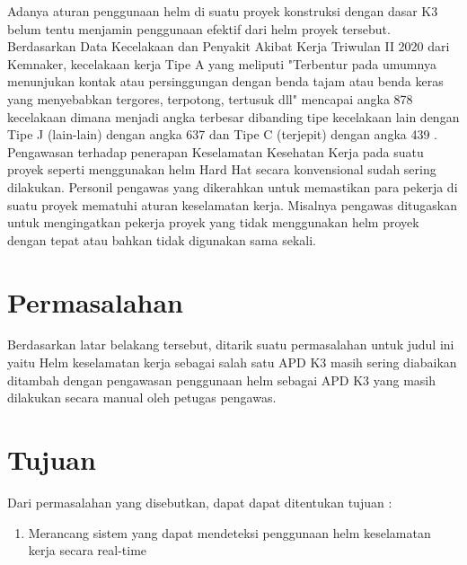 Adanya aturan penggunaan helm di suatu proyek konstruksi dengan dasar K3 belum tentu menjamin penggunaan efektif dari helm proyek tersebut. 
Berdasarkan Data Kecelakaan dan Penyakit Akibat Kerja Triwulan II 2020 dari Kemnaker, kecelakaan kerja Tipe A yang meliputi "Terbentur pada umumnya menunjukan kontak atau persinggungan dengan benda tajam atau benda keras yang menyebabkan tergores, terpotong, tertusuk dll" mencapai angka 878 kecelakaan dimana menjadi angka terbesar dibanding tipe kecelakaan lain dengan Tipe J (lain-lain) dengan angka 637 dan Tipe C (terjepit) dengan angka 439 \cite{satudata_kecelakaan_kerja}.
Pengawasan terhadap penerapan Keselamatan Kesehatan Kerja pada suatu proyek seperti menggunakan helm Hard Hat secara konvensional sudah sering dilakukan. Personil pengawas yang dikerahkan untuk memastikan para pekerja di suatu proyek mematuhi aturan keselamatan kerja. Misalnya pengawas ditugaskan untuk mengingatkan pekerja proyek yang tidak menggunakan helm proyek dengan tepat atau bahkan tidak digunakan sama sekali.\cite{li2020deep}

\section{Permasalahan}
\label{sec:permasalahan}

Berdasarkan latar belakang tersebut, ditarik suatu permasalahan untuk judul ini yaitu Helm keselamatan kerja sebagai salah satu APD K3 masih sering diabaikan ditambah dengan pengawasan penggunaan helm sebagai APD K3 yang masih dilakukan secara manual oleh petugas pengawas.

\section{Tujuan}
\label{sec:Tujuan}

Dari permasalahan yang disebutkan, dapat dapat ditentukan tujuan :

\begin{enumerate}[nolistsep]

  \item Merancang sistem yang dapat mendeteksi penggunaan helm keselamatan kerja secara real-time

\end{enumerate}


